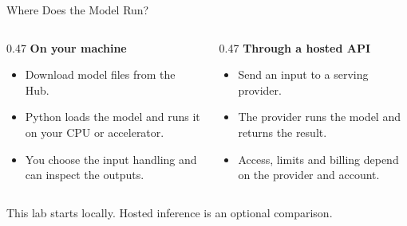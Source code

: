 \documentclass[aspectratio=169]{beamer}
\begin{document}
\begin{frame}{Where Does the Model Run?}
  \begin{columns}[T,onlytextwidth]
    \begin{column}{0.47\linewidth}
      \textbf{On your machine}
      \begin{itemize}
        \item Download model files from the Hub.
        \item Python loads the model and runs it on your CPU or accelerator.
        \item You choose the input handling and can inspect the outputs.
      \end{itemize}
    \end{column}
    \begin{column}{0.47\linewidth}
      \textbf{Through a hosted API}
      \begin{itemize}
        \item Send an input to a serving provider.
        \item The provider runs the model and returns the result.
        \item Access, limits and billing depend on the provider and account.
      \end{itemize}
    \end{column}
  \end{columns}
  \vspace{0.5em}
  \small This lab starts locally. Hosted inference is an optional comparison.
\end{frame}
\end{document}
